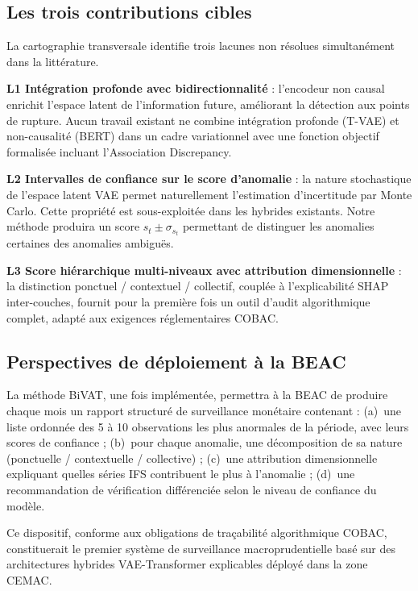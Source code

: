 \documentclass[12pt,a4paper]{article}
\begin{document}
\subsection{Les trois contributions cibles}

La cartographie transversale identifie trois lacunes non résolues simultanément dans la littérature.

\textbf{L1  Intégration profonde avec bidirectionnalité} : l'encodeur non causal enrichit l'espace latent de l'information future, améliorant la détection aux points de rupture. Aucun travail existant ne combine intégration profonde (T-VAE) et non-causalité (BERT) dans un cadre variationnel avec une fonction objectif formalisée incluant l'Association Discrepancy.

\textbf{L2  Intervalles de confiance sur le score d'anomalie} : la nature stochastique de l'espace latent VAE permet naturellement l'estimation d'incertitude par Monte Carlo. Cette propriété est sous-exploitée dans les hybrides existants. Notre méthode produira un score $s_t \pm \sigma_{s_t}$ permettant de distinguer les anomalies certaines des anomalies ambiguës.

\textbf{L3  Score hiérarchique multi-niveaux avec attribution dimensionnelle} : la distinction ponctuel / contextuel / collectif, couplée à l'explicabilité SHAP inter-couches, fournit pour la première fois un outil d'audit algorithmique complet, adapté aux exigences réglementaires COBAC.

\subsection{Perspectives de déploiement à la BEAC}

La méthode BiVAT, une fois implémentée, permettra à la BEAC de produire chaque mois un rapport structuré de surveillance monétaire contenant : (a)~une liste ordonnée des 5 à 10 observations les plus anormales de la période, avec leurs scores de confiance ; (b)~pour chaque anomalie, une décomposition de sa nature (ponctuelle / contextuelle / collective) ; (c)~une attribution dimensionnelle expliquant quelles séries IFS contribuent le plus à l'anomalie ; (d)~une recommandation de vérification différenciée selon le niveau de confiance du modèle.

Ce dispositif, conforme aux obligations de traçabilité algorithmique COBAC, constituerait le premier système de surveillance macroprudentielle basé sur des architectures hybrides VAE-Transformer explicables déployé dans la zone CEMAC.
\end{document}

